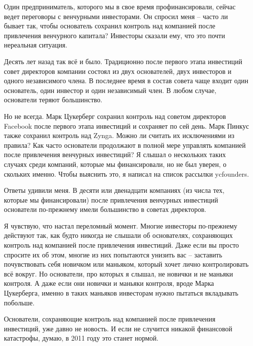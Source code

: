 \documentclass[ebook,12pt,oneside,openany]{memoir}
\begin{document}
\maketitle

Один предприниматель, которого мы в свое время профинансировали,
сейчас ведет переговоры с венчурными инвесторами. Он спросил меня –
часто ли бывает так, чтобы основатель сохранил контроль над компанией
после привлечения венчурного капитала? Инвесторы сказали ему, что это
почти нереальная ситуация.

Десять лет назад так всё и было. Традиционно после первого этапа
инвестиций совет директоров компании состоял из двух основателей, двух
инвесторов и одного независимого члена. В последнее время в состав
совета чаще входит один основатель, один инвестор и один независимый
член. В любом случае, основатели теряют большинство.

Но не всегда. Марк Цукерберг сохранил контроль над советом директоров
Facebook после первого этапа инвестиций и сохраняет по сей день. Марк
Пинкус также сохранил контроль над Zynga. Можно ли считать их
исключениями из правила? Как часто основатели продолжают в полной мере
управлять компанией после привлечения венчурных инвестиций? Я слышал о
нескольких таких случаях среди компаний, которые мы финансировали, но
не был уверен, о скольких именно. Чтобы выяснить это, я написал на
список рассылки ycfounders.

Ответы удивили меня. В десяти или двенадцати компаниях (из числа тех,
которые мы финансировали) после привлечения венчурных инвестиций
основатели по-прежнему имели большинство в советах директоров.

Я чувствую, что настал переломный момент. Многие инвесторы по-прежнему
действуют так, как будто никогда не слышали об основателях,
сохраняющих контроль над компанией после привлечения инвестиций. Даже
если вы просто спросите их об этом, многие из них попытаются унизить
вас – заставить почувствовать себя новичком или маньяком, который
хочет лично контролировать всё вокруг. Но основатели, про которых я
слышал, не новички и не маньяки контроля. А даже если они новички и
маньяки контроля, вроде Марка Цукерберга, именно в таких маньяков
инвесторам нужно пытаться вкладывать побольше.

Основатели, сохраняющие контроль над компанией после привлечения
инвестиций, уже давно не новость. И если не случится никакой
финансовой катастрофы, думаю, в 2011 году это станет нормой.
\end{document}
